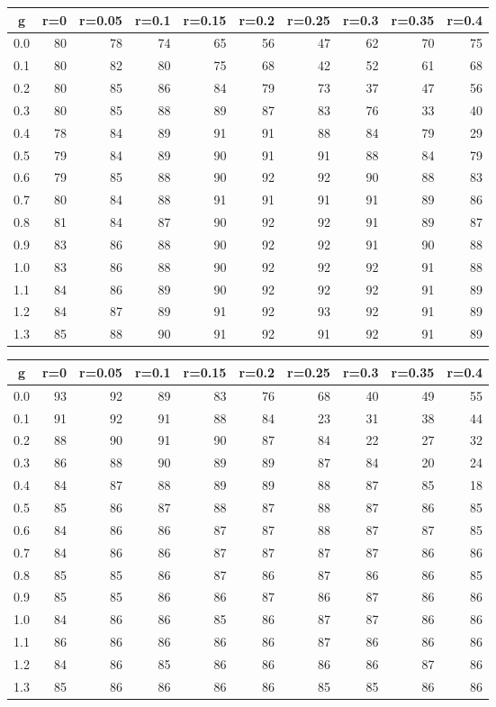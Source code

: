 %
\begin{table}[!tbp]
 \begin{center}
 \begin{tabular}{rrrrrrrrrr}\hline\hline
\multicolumn{1}{c}{g}&\multicolumn{1}{c}{r=0}&\multicolumn{1}{c}{r=0.05}&\multicolumn{1}{c}{r=0.1}&\multicolumn{1}{c}{r=0.15}&\multicolumn{1}{c}{r=0.2}&\multicolumn{1}{c}{r=0.25}&\multicolumn{1}{c}{r=0.3}&\multicolumn{1}{c}{r=0.35}&\multicolumn{1}{c}{r=0.4}\tabularnewline
\hline
0.0&80&78&74&65&56&47&62&70&75\tabularnewline
0.1&80&82&80&75&68&42&52&61&68\tabularnewline
0.2&80&85&86&84&79&73&37&47&56\tabularnewline
0.3&80&85&88&89&87&83&76&33&40\tabularnewline
0.4&78&84&89&91&91&88&84&79&29\tabularnewline
0.5&79&84&89&90&91&91&88&84&79\tabularnewline
0.6&79&85&88&90&92&92&90&88&83\tabularnewline
0.7&80&84&88&91&91&91&91&89&86\tabularnewline
0.8&81&84&87&90&92&92&91&89&87\tabularnewline
0.9&83&86&88&90&92&92&91&90&88\tabularnewline
1.0&83&86&88&90&92&92&92&91&88\tabularnewline
1.1&84&86&89&90&92&92&92&91&89\tabularnewline
1.2&84&87&89&91&92&93&92&91&89\tabularnewline
1.3&85&88&90&91&92&91&92&91&89\tabularnewline
\hline
\end{tabular}

\end{center}

\end{table}

%
\begin{table}[!tbp]
 \begin{center}
 \begin{tabular}{rrrrrrrrrr}\hline\hline
\multicolumn{1}{c}{g}&\multicolumn{1}{c}{r=0}&\multicolumn{1}{c}{r=0.05}&\multicolumn{1}{c}{r=0.1}&\multicolumn{1}{c}{r=0.15}&\multicolumn{1}{c}{r=0.2}&\multicolumn{1}{c}{r=0.25}&\multicolumn{1}{c}{r=0.3}&\multicolumn{1}{c}{r=0.35}&\multicolumn{1}{c}{r=0.4}\tabularnewline
\hline
0.0&93&92&89&83&76&68&40&49&55\tabularnewline
0.1&91&92&91&88&84&23&31&38&44\tabularnewline
0.2&88&90&91&90&87&84&22&27&32\tabularnewline
0.3&86&88&90&89&89&87&84&20&24\tabularnewline
0.4&84&87&88&89&89&88&87&85&18\tabularnewline
0.5&85&86&87&88&87&88&87&86&85\tabularnewline
0.6&84&86&86&87&87&88&87&87&85\tabularnewline
0.7&84&86&86&87&87&87&87&86&86\tabularnewline
0.8&85&85&86&87&86&87&86&86&85\tabularnewline
0.9&85&85&86&86&87&86&87&86&86\tabularnewline
1.0&84&86&86&85&86&87&87&86&86\tabularnewline
1.1&86&86&86&86&86&87&86&86&86\tabularnewline
1.2&84&86&85&86&86&86&86&87&86\tabularnewline
1.3&85&86&86&86&86&85&85&86&86\tabularnewline
\hline
\end{tabular}

\end{center}

\end{table}

